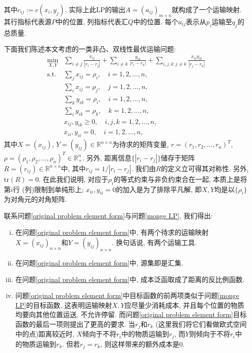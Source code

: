\documentclass[UTF8,10.5pt,a4paper]{ctexart}
\theoremstyle{definition}
\theoremstyle{definition}
\newcommand{\trace}{\mathrm{tr}}
\begin{document}
其中$c_{ij}:=c(x_i,y_j)$. 实际上此LP的输出$A=(a_{ij})_{m\times n}$就构成了一个运输映射. 其行指标代表源$P$中的位置, 列指标代表汇$Q$中的位置. 每个$a_{ij}$表示从$p_i$运输至$q_j$的总质量. 
\par 下面我们陈述本文考虑的一类非凸、双线性最优运输问题:
\begin{equation}
\begin{array}{ll}
\min\limits_{X,Y} & \sum\limits_{i\ne j}\frac{x_{ij}}{|r_i-r_j|}+\sum\limits_{i\ne k}\frac{y_{ik}}{|r_i-r_k|}+\sum\limits_{i,j,k:j\ne k}\frac{x_{ij}y_{ik}}{|r_j-r_k|}\\
\mathrm{s.t.} & \sum\limits_jx_{ij}=\rho_i,\quad i=1,2,\ldots,n,\\
& \sum\limits_ix_{ij}=\rho_j,\quad j=1,2,\ldots,n,\\
& \sum\limits_ky_{ik}=\rho_i,\quad i=1,2,\ldots,n,\\
& \sum\limits_iy_{ik}=\rho_k,\quad k=1,2,\ldots,n,\\
& x_{ij},y_{ik}\ge0,\quad i,j,k=1,2,\ldots,n,\\
& x_{ii},y_{ii}=0,\quad i=1,2,\ldots,n,
\end{array}
\label{original problem element form}
\end{equation}
其中$X=(x_{ij})$, $Y=(y_{ij})\in\mathbb{R}^{n\times n}$为待求的矩阵变量, $r=(r_1,r_2,\ldots,r_n)^T$, $\rho=(\rho_1,\rho_2,\ldots,\rho_n)^T\in\mathbb{R}^n_+$. 另外, 距离信息$\{|r_i-r_j|\}$储存于矩阵$R=(r_{ij})\in\mathbb{R}^{n\times n}$中, 其中$r_{ij}=1/|r_i-r_j|$. 我们由$R$的定义立可得其对称性.
另外, $\trace(R)=0$. 在此我们说明, 对应于$\rho_i$的等式约束与非负约束合在一起, 本质上是将第$i$行 (列)限制到单纯形上; $x_{ii},y_{ii}=0$的加入是为了排除平凡解, 即$X,Y$均是以$\{\rho_i\}$为对角元的对角矩阵.
\par 联系问题\eqref{original problem element form}与问题\eqref{monge LP}, 我们得出:
\begin{enumerate}[(i)]
\item 在问题\eqref{original problem element form}中, 有两个待求的运输映射$X=(x_{ij})_{n\times n}$和$Y=(y_{ij})_{n\times n}$. 换句话说, 有两个运输工具.
\item 在问题\eqref{original problem element form}中, 源集即是汇集.
\item 在问题\eqref{original problem element form}中, 成本泛函取成了距离的反比例函数.
\item 问题\eqref{original problem element form}中目标函数的前两项类似于问题\eqref{monge LP}的目标函数, 这表明运输映射$X,Y$应尽量少消耗成本, 并且每个位置的物质均要向其他位置运送, 不允许停留. 而问题\eqref{original problem element form}目标函数的最后一项则提出了更高的要求. 当$r_j$和$r_k$ (这里我们将它们看做欧式空间中的点)距离较近时, $X$倾向于不将$r_i$中的物质运输到$r_j$, 而$Y$则倾向于不将$r_i$中的物质运输到$r_k$. 但若$r_j=r_k$, 则这样带来的额外成本是0. 
\end{enumerate}
\end{document}
